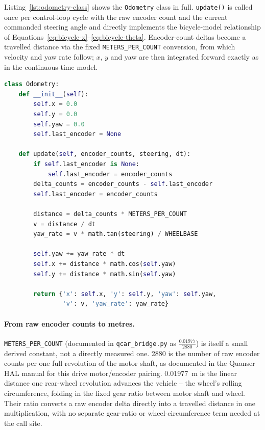 Listing~\ref{lst:odometry-class} shows the \texttt{Odometry} class in
full. \texttt{update()} is called once per control-loop cycle with
the raw encoder count and the current commanded steering angle and
directly implements the bicycle-model relationship of
Equations~\ref{eq:bicycle-x}--\ref{eq:bicycle-theta}. Encoder-count
deltas become a travelled distance via the fixed
\texttt{METERS\_PER\_COUNT} conversion, from which velocity and yaw
rate follow; $x$, $y$ and yaw are then integrated forward exactly as
in the continuous-time model.

\begin{lstlisting}[language=Python,caption={Bicycle-model dead-reckoning odometry (\texttt{qcar\_bridge.py}).},label={lst:odometry-class}]
class Odometry:
    def __init__(self):
        self.x = 0.0
        self.y = 0.0
        self.yaw = 0.0
        self.last_encoder = None

    def update(self, encoder_counts, steering, dt):
        if self.last_encoder is None:
            self.last_encoder = encoder_counts
        delta_counts = encoder_counts - self.last_encoder
        self.last_encoder = encoder_counts

        distance = delta_counts * METERS_PER_COUNT
        v = distance / dt
        yaw_rate = v * math.tan(steering) / WHEELBASE

        self.yaw += yaw_rate * dt
        self.x += distance * math.cos(self.yaw)
        self.y += distance * math.sin(self.yaw)

        return {'x': self.x, 'y': self.y, 'yaw': self.yaw,
                'v': v, 'yaw_rate': yaw_rate}
\end{lstlisting}

\paragraph{From raw encoder counts to metres.}
\texttt{METERS\_PER\_COUNT} (documented in \texttt{qcar\_bridge.py} as
$\frac{0.01977}{2880}$) is itself a small derived constant, not a
directly measured one. 2880 is the number of raw encoder counts per
one full revolution of the motor shaft, as documented in the Quanser
HAL manual \cite{quanser2023qcar} for this drive motor/encoder
pairing. \SI{0.01977}{\meter} is the linear distance one rear-wheel
revolution advances the vehicle -- the wheel's rolling circumference,
folding in the fixed gear ratio between motor shaft and wheel. Their
ratio converts a raw encoder delta directly into a travelled distance
in one multiplication, with no separate gear-ratio or
wheel-circumference term needed at the call site.

